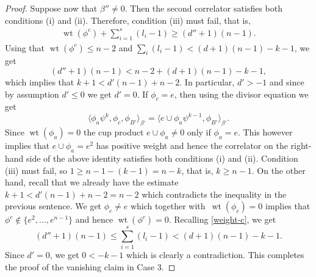 \documentclass[10pt,a4paper]{article}
\numberwithin{equation}{section}
\begin{document}
\begin{proof}
Suppose now that $\beta''\neq 0$. Then the second correlator satisfies both conditions (i) and (ii). Therefore, condition (iii) must fail, that is,
\begin{gather}\label{weight-c}
\operatorname{wt}(\phi^c) + \sum_{i=1}^s (l_i-1) \geq (d''+1)(n-1).
\end{gather}
Using that $\operatorname{wt}(\phi^c)\leq n-2$ and $\sum_i (l_i-1)<(d+1)(n-1)-k-1$, we get
\[
(d''+1)(n-1) < n-2 + (d+1)(n-1)-k-1,
\]
which implies that $k+1<d'(n-1) +n-2.$ In particular, $d'>-1$ and since by assumption $d'\leq 0$ we get $d'=0$. If $\phi_c=e$, then using the divisor equation we get
\[
\big\langle \phi_a \psi^k, \phi_c, \phi_{B'}\big\rangle_{\beta'} =
\big\langle e\cup \phi_a \psi^{k-1}, \phi_{B'}\big\rangle_{\beta'}.
\]
Since $\operatorname{wt}(\phi_a)=0$ the cup product $e\cup \phi_a\neq 0$ only if $\phi_a=e$. This however implies that $e\cup \phi_a=e^2$ has positive weight and hence the correlator on the right-hand side of the above identity satisfies both conditions (i) and (ii). Condition (iii) must fail, so $1\geq n-1-(k-1) =n-k$, that is, $k\geq n-1$. On the other hand, recall that we already have the estimate $k+1< d'(n-1) + n-2=n-2$ which contradicts the inequality in the previous sentence. We get $\phi_c\neq e$ which together with~$\operatorname{wt}(\phi_c)=0$ implies that
$\phi^c \notin \big\{e^2,\dots, e^{n-1}\big\}$ and hence $\operatorname{wt}(\phi^c)=0$. Recalling \eqref{weight-c}, we get
\[
(d''+1)(n-1) \leq \sum_{i=1}^{s} (l_i-1) < (d+1)(n-1) -k-1.
\]
Since $d'=0$, we get $0<-k-1$ which is clearly a contradiction. This completes the proof of the vanishing claim in Case 3.


\end{proof}
\end{document}
